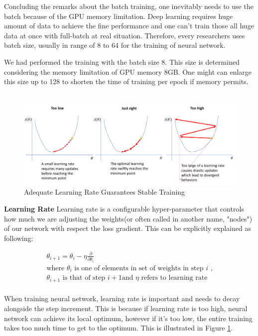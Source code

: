 \documentclass[sigconf]{acmart}
\begin{document}
Concluding the remarks about the batch training, one inevitably needs to use the batch because of the GPU memory limitation. Deep learning requires huge amount of data to achieve the fine performance and one can't train those all huge data at once with full-batch at real situation. Therefore, every researchers uses batch size, usually in range of 8 to 64 for the training of neural network. 

We had performed the training with the batch size 8. This size is determined considering the memory limitation of GPU memory 8GB. One might can enlarge this size up to 128 to shorten the time of training per epoch if memory permits.\\\\ 
\begin{figure}
  \includegraphics[width=\linewidth]{lr.png}
  \caption{Adequate Learning Rate Guarantees Stable Training \cite{lrExample}}
  \label{LrFig}
\end{figure}
\textbf{Learning Rate} Learning rate is a configurable hyper-parameter that controls how much we are adjusting the weights(or often called in another name, "nodes") of our network with respect the loss gradient. This can be explicitly explained as following:

\begin{gather*}
    \theta_{i+1} = \theta_{i} - \eta \frac{\partial}{\partial \theta_{i}} \\
    \text{where } \theta_{i} \text{ is one of elements in set of weights in step } i \text{ ,} \\ \theta_{i+1} \text{ is that of step } i+1 \text{and } \eta \text{ refers to learning rate} 
\end{gather*}\\
When training neural network, learning rate is important and needs to decay alongside the step increment. This is because if learning rate is too high, neural network can achieve its local optimum, however if it's too low, the entire training takes too much time to get to the optimum. This is illustrated in Figure \ref{LrFig}. 
\end{document}
